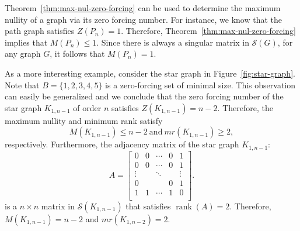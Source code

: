 \documentclass{article}
\theoremstyle{definition}
\newcommand\rank[1]{\operatorname{rank}\left(#1\right)}
\begin{document}
Theorem~\ref{thm:max-nul-zero-forcing} can be used to determine the maximum nullity of a graph via its zero forcing number. 
For instance, we know that the path graph satisfies $Z(P_{n})=1$.
Therefore, Theorem~\ref{thm:max-nul-zero-forcing} implies that $M(P_{n}) \leq 1$.
Since there is always a singular matrix in $\mathcal{S}(G)$, for any graph $G$, it follows that $M(P_{n})=1$.

As a more interesting example, consider the star graph in Figure~\ref{fig:star-graph}.
Note that $B=\{1,2,3,4,5\}$ is a zero-forcing set of minimal size. 
This observation can easily be generalized and we conclude that the zero forcing number of the star graph $K_{1,n-1}$ of order $n$ satisfies $Z(K_{1,n-1}) = n-2$.
Therefore, the maximum nullity and minimum rank satisfy
\[
M(K_{1,n-1}) \leq n-2~\text{and}~mr(K_{1,n-1}) \geq 2,
\]
respectively.
Furthermore, the adjacency matrix of the star graph $K_{1,n-1}$:
\[
A = \begin{bmatrix} 
		0 & 0 & \cdots & 0 & 1 \\
		0 & 0 & \cdots & 0 & 1 \\
		\vdots & & \ddots & &  \vdots \\
		0 & & & 0 & 1 \\
		1 & 1 & \cdots & 1 & 0 \\
	\end{bmatrix}.
\]
is a $n\times n$ matrix in $\mathcal{S}(K_{1,n-1})$ that satisfies $\rank{A} = 2$.
Therefore, $M(K_{1,n-1})=n-2$ and $mr(K_{1,n-2}) = 2$.

\end{document}

